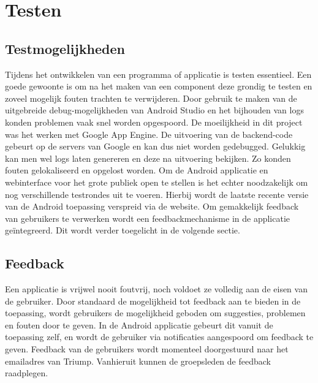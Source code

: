 \chapter{Testen}%
\section{Testmogelijkheden}
Tijdens het ontwikkelen van een programma of applicatie is testen essentieel. Een goede gewoonte is om na het maken van een component deze grondig te testen en zoveel mogelijk fouten trachten te verwijderen.
Door gebruik te maken van de uitgebreide debug-mogelijkheden van Android Studio en het bijhouden van logs konden problemen vaak snel worden opgespoord. De moeilijkheid in dit project was het werken met Google App Engine. De uitvoering van de backend-code gebeurt op de servers van Google en kan dus niet worden gedebugged. Gelukkig kan men wel logs laten genereren en deze na uitvoering bekijken.
Zo konden fouten gelokaliseerd en opgelost worden.
Om de Android applicatie en webinterface voor het grote publiek open te stellen is het echter noodzakelijk om nog verschillende testrondes uit te voeren. Hierbij wordt de laatste recente versie van de Android toepassing verspreid via de website. Om gemakkelijk feedback van gebruikers te verwerken wordt een feedbackmechanisme in de applicatie geïntegreerd. Dit wordt verder toegelicht in de volgende sectie.

\section{Feedback}
Een applicatie is vrijwel nooit foutvrij, noch voldoet ze volledig aan de eisen van de gebruiker. Door standaard de mogelijkheid tot feedback aan te bieden in de toepassing, wordt gebruikers de mogelijkheid geboden om suggesties, problemen en fouten door te geven.
In de Android applicatie gebeurt dit vanuit de toepassing zelf, en wordt de gebruiker via notificaties aangespoord om feedback te geven. Feedback van de gebruikers wordt momenteel doorgestuurd naar het emailadres van Triump. Vanhieruit kunnen de groepsleden de feedback raadplegen.

